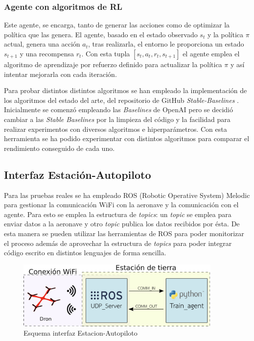  \subsubsection{Agente con algoritmos de RL}
 Este agente, se encarga, tanto de generar las acciones como de optimizar la política que las genera. El agente, basado en el estado observado $s_t$ y la política $\pi$ actual, genera una acción $a_t$, tras realizarla, el entorno le proporciona un estado $s_{t+1}$ y una recompensa $r_t$.
 Con esta tupla $[s_t,a_t,r_t,s_{t+1}]$ el agente emplea el algoritmo de aprendizaje por refuerzo definido para actualizar la política $\pi$ y así intentar mejorarla con cada iteración. 

Para probar distintos distintos algoritmos se han empleado la implementación de los algoritmos del estado del arte, del repositorio de GitHub \textit{Stable-Baselines} \cite{stable-baselines}. Inicialmente se comenzó empleando las \textit{Baselines} de OpenAI \cite{OpenAIbaselines} pero se decidió cambiar a las \textit{Stable Baselines} por la limpieza del código y la facilidad para realizar experimentos con diversos algoritmos e hiperparámetros. Con esta herramienta se ha podido experimentar con distintos algoritmos para comparar el rendimiento conseguido de cada uno.


\subsection{Interfaz Estación-Autopiloto}

Para las pruebas reales se ha empleado ROS (Robotic Operative System) Melodic para gestionar la comunicación WiFi con la aeronave y la comunicación con el agente. Para esto se emplea la estructura de \textit{topics}: un \textit{topic} se emplea para enviar datos a la aeronave y otro \textit{topic} publica los datos recibidos por ésta. De esta manera se pueden utilizar las herramientas de ROS para poder monitorizar el proceso además de aprovechar la estructura de \textit{topics} para poder integrar código escrito en distintos lenguajes de forma sencilla.

\begin{figure}[htb!]
	\centering
	\includegraphics[width=0.9\textwidth]{software/Arquitectura}
	\caption{Esquema interfaz Estacion-Autopiloto}
	\label{hardware:esc_explicacion}
\end{figure}





